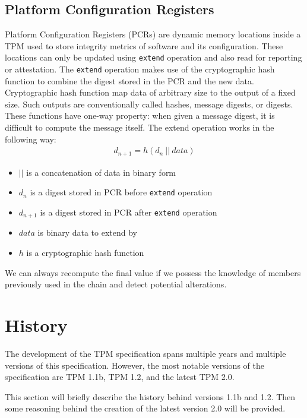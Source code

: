 \subsection{Platform Configuration Registers}\label{sec:pcr}
Platform Configuration Registers (PCRs) are dynamic memory locations inside a TPM used to store integrity metrics of software and its configuration. These locations can only be updated using \texttt{extend} operation and also read for reporting or attestation. The \texttt{extend} operation makes use of the cryptographic hash function to combine the digest stored in the PCR and the new data. Cryptographic hash function map data of arbitrary size to the output of a fixed size. Such outputs are conventionally called hashes, message digests, or digests. These functions have one-way property: when given a message digest, it is difficult  to compute the message itself. The extend operation works in the following way:
\begin{align*}
    d_{n+1} = h(d_{n}\ ||\ data)
\end{align*}
\begin{itemize}
    \item $||$ is a concatenation of data in binary form
    \item $ d_{n} $ is a digest stored in PCR before \texttt{extend} operation
    \item $ d_{n+1} $ is a digest stored in PCR after \texttt{extend} operation
    \item $ data $ is binary data to extend by
    \item $ h $ is a cryptographic hash function
\end{itemize}

We can always recompute the final value if we possess the knowledge of members previously used in the chain and detect potential alterations.


\section{History}
The development of the TPM specification spans multiple years and multiple versions of this specification. However, the most notable versions of the specification are TPM 1.1b, TPM 1.2, and the latest TPM 2.0. 

This section will briefly describe the history behind versions 1.1b and 1.2. Then some reasoning behind the creation of the latest version 2.0 will be provided.

